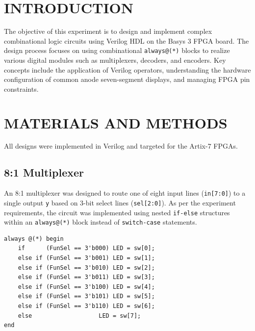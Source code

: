 \documentclass[12pt,a4paper]{article}
\begin{document}
\section{INTRODUCTION}
The objective of this experiment is to design and implement complex combinational logic circuits using Verilog HDL on the Basys 3 FPGA board. The design process focuses on using combinational \texttt{always@(*)} blocks to realize various digital modules such as multiplexers, decoders, and encoders. Key concepts include the application of Verilog operators, understanding the hardware configuration of common anode seven-segment displays, and managing FPGA pin constraints.

\section{MATERIALS AND METHODS}
All designs were implemented in Verilog and targeted for the Artix-7 FPGAs.

\subsection{8:1 Multiplexer}
An 8:1 multiplexer was designed to route one of eight input lines (\texttt{in[7:0]}) to a single output \texttt{y} based on 3-bit select lines (\texttt{sel[2:0]}). As per the experiment requirements, the circuit was implemented using nested \texttt{if-else} structures within an \texttt{always@(*)} block instead of \texttt{switch-case} statements.
\begin{lstlisting}[caption={8:1 Mux Verilog Implementation}, label={code:Mux}]
always @(*) begin
    if      (FunSel == 3'b000) LED = sw[0];
    else if (FunSel == 3'b001) LED = sw[1];
    else if (FunSel == 3'b010) LED = sw[2];
    else if (FunSel == 3'b011) LED = sw[3];
    else if (FunSel == 3'b100) LED = sw[4];
    else if (FunSel == 3'b101) LED = sw[5];
    else if (FunSel == 3'b110) LED = sw[6];
    else                   LED = sw[7]; 
end
\end{lstlisting}
\end{document}
